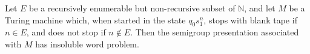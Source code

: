 Let $E$ be a recursively enumerable but non-recursive subset of $\mathbb{N}$, and let $M$ be a Turing machine which, when started in the state $q_0 s_1^n$, stops with blank tape if $n \in E$, and does not stop if $n \notin E$. Then the semigroup presentation associated with $M$ has insoluble word problem.
